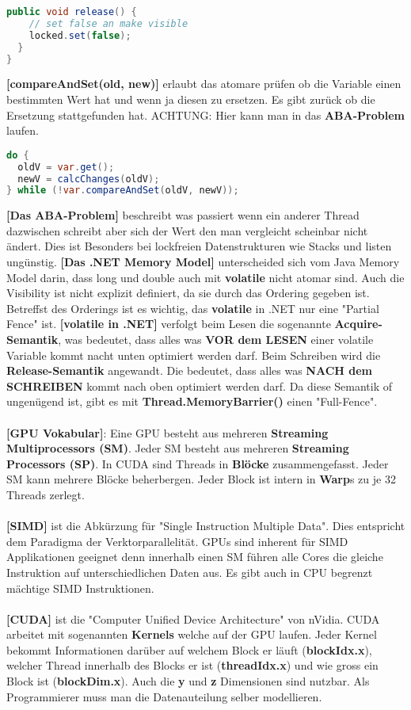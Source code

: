 \documentclass[8pt]{extarticle}
\let\oldtextbf\textbf
\renewcommand{\textbf}{\tiny\oldtextbf}
\begin{document}
\begin{multicols*}{5}
\begin{lstlisting}[language=java]
  public void release() {
    // set false an make visible
    locked.set(false);
  }
}
\end{lstlisting}
\textbf{[compareAndSet(old, new)]} erlaubt das atomare prüfen ob die Variable einen bestimmten Wert hat und wenn ja diesen zu ersetzen. Es gibt zurück ob die Ersetzung stattgefunden hat. ACHTUNG: Hier kann man in das \textbf{ABA-Problem} laufen.
\begin{lstlisting}[language=java]
do {
  oldV = var.get();
  newV = calcChanges(oldV);
} while (!var.compareAndSet(oldV, newV));
\end{lstlisting}
\textbf{[Das ABA-Problem]} beschreibt was passiert wenn ein anderer Thread dazwischen schreibt aber sich der Wert den man vergleicht scheinbar nicht ändert. Dies ist Besonders bei lockfreien Datenstrukturen wie Stacks und listen ungünstig.
\textbf{[Das .NET Memory Model]} unterscheided sich vom Java Memory Model darin, dass long und double auch mit \textbf{volatile} nicht atomar sind. Auch die Visibility ist nicht explizit definiert, da sie durch das Ordering gegeben ist. Betreffst des Orderings ist es wichtig, das \textbf{volatile} in .NET nur eine "Partial Fence" ist.
\textbf{[volatile in .NET]} verfolgt beim Lesen die sogenannte \textbf{Acquire-Semantik}, was bedeutet, dass alles was \textbf{VOR dem LESEN} einer volatile Variable kommt nacht unten optimiert werden darf. Beim Schreiben wird die \textbf{Release-Semantik} angewandt. Die bedeutet, dass alles was \textbf{NACH dem SCHREIBEN} kommt nach oben optimiert werden darf. Da diese Semantik of ungenügend ist, gibt es mit \textbf{Thread.MemoryBarrier()} einen "Full-Fence".\\\\
\textbf{[GPU Vokabular]}: Eine GPU besteht aus mehreren \textbf{Streaming Multiprocessors (SM)}. Jeder SM besteht aus mehreren \textbf{Streaming Processors (SP)}. In CUDA sind Threads in \textbf{Blöcke} zusammengefasst. Jeder SM kann mehrere Blöcke beherbergen. Jeder Block ist intern in \textbf{Warp}s zu je 32 Threads zerlegt.\\\\
\textbf{[SIMD]} ist die Abkürzung für "Single Instruction Multiple Data". Dies entspricht dem Paradigma der Verktorparallelität. GPUs sind inherent für SIMD Applikationen geeignet denn innerhalb einen SM führen alle Cores die gleiche Instruktion auf unterschiedlichen Daten aus. Es gibt auch in CPU begrenzt mächtige SIMD Instruktionen.\\\\
\textbf{[CUDA]} ist die "Computer Unified Device Architecture" von nVidia. CUDA arbeitet mit sogenannten \textbf{Kernels} welche auf der GPU laufen. Jeder Kernel bekommt Informationen darüber auf welchem Block er läuft (\textbf{blockIdx.x}), welcher Thread innerhalb des Blocks er ist (\textbf{threadIdx.x}) und wie gross ein Block ist (\textbf{blockDim.x}). Auch die \textbf{y} und \textbf{z} Dimensionen sind nutzbar. Als Programmierer muss man die Datenauteilung selber modellieren.

\end{multicols*}
\end{document}
